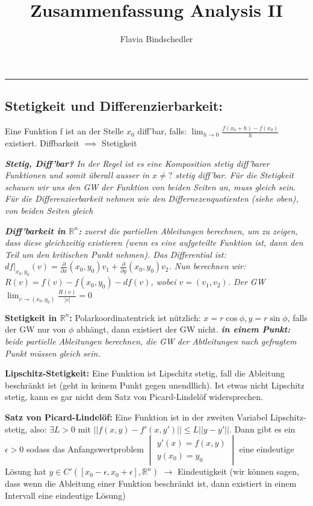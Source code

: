 \documentclass[a3paper, ngerman, 8pt]{article}
\title{Zusammenfassung Analysis II}
\author{Flavia Bindschedler}
\begin{document}
\makeatletter
{\Large \textbf{\@title}}
\hfill
{\@author}
\makeatother
\hrule

\begin{multicols*}{3}

\subsection*{Stetigkeit und Differenzierbarkeit:} Eine Funktion f ist an der Stelle $x_0$ diff'bar, falls: $ \lim_{h \to 0} \frac{f(x_0+h)-f(x_0)}{h}$ existiert. Diffbarkeit $\implies$ Stetigkeit

\textit{\textbf{Stetig, Diff'bar?} In der Regel ist es eine Komposition stetig diff'barer Funktionen und somit überall ausser in $x\neq ?$ stetig diff'bar. Für die Stetigkeit schauen wir uns den GW der Funktion von beiden Seiten an, muss gleich sein. Für die Differenzierbarkeit nehmen wie den Differnezenquotienten (siehe oben), von beiden Seiten gleich}

\textit{\textbf{Diff'barkeit in $\mathbb{R}^n$:} zuerst die partiellen Ableitungen berechnen, um zu zeigen, dass diese gleichzeitig existieren (wenn es eine aufgeteilte Funktion ist, dann den Teil um den kritischen Punkt nehmen). Das Differential ist: $df \vert _{{x_0, y_0}} (v) = \frac{\partial }{\partial x} (x_0, y_0)v_1 + \frac{\partial }{\partial y}(x_0, y_0)v_2$. Nun berechnen wir: $R(v)=f(v) - f(x_0, y_0) - df(v)$, wobei $v=(v_1, v_2)$. Der GW  $\lim_{v \to (x_0, y_0)} \frac{R(v)}{\vert v \vert} = 0$}

\textbf{Stetigkeit in $\mathbb{R}^n$:} Polarkoordinatentrick ist nützlich: 
$x= r \cos\phi, y=r \sin\phi$, falls der GW nur von $\phi$ abhängt, dann existiert der GW nicht. \textit{\textbf{in einem Punkt:} beide partielle Ableitungen berechnen, die GW der Abtleitungen nach gefragtem Punkt müssen gleich sein.}

\textbf{Lipschitz-Stetigkeit:} Eine Funktion ist Lipschitz stetig, fall die Ableitung beschränkt ist (geht in keinem Punkt gegen unendllich). Ist etwas nicht Lipschitz stetig, kann es gar nicht dem Satz von Picard-Lindelöf widersprechen. 


\textbf{Satz von Picard-Lindelöf:} Eine Funktion ist in der zweiten Variabel Lipschitz-stetig, also: $\exists L > 0$ mit $\vert \vert f(x,y)-f'(x,y')\vert \vert \leq L\vert \vert y-y'\vert \vert$. Dann gibt es ein $\epsilon > 0$ sodass das Anfangswertproblem 
$\begin{vmatrix}
	y'(x)=f(x,y)\\
	y(x_0)=y_0
\end{vmatrix}$ eine eindeutige Lösung hat $y\in C'([x_0-\epsilon, x_0+\epsilon], \mathbb{R}^n)$ $\to $ Eindeutigkeit (wir können sagen, dass wenn die Ableitung einer Funktion beschränkt ist, dann existiert in einem Intervall eine eindeutige Lösung)


\end{multicols*}
\end{document}
